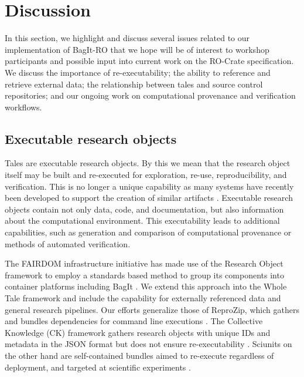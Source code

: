 \documentclass[conference]{IEEEtran}
\begin{document}
\section{Discussion} \label{discussion}

In this section, we highlight and discuss several issues related to our implementation of BagIt-RO that we hope will be of interest to workshop participants and possible input into current work on the RO-Crate specification. We discuss the importance of re-executability; the ability to reference and retrieve external data; the relationship between tales and source control repositories; and our ongoing work on computational provenance and verification workflows.

\subsection{Executable research objects}
Tales are executable research objects. By this we mean that the
research object itself may be built and re-executed for exploration,
re-use, reproducibility, and verification. This is no longer  a unique capability as many systems have recently been developed to support the creation of similar artifacts \cite{Chirigati2016, Binder2018, Yuan2018}. Executable research objects contain not only data, code, and documentation, but also information about the computational environment. This executability leads to additional capabilities, such as generation and comparison of computational provenance or methods of automated verification.

The FAIRDOM infrastructure initiative has made use of the Research
Object framework to employ a standards based method to group its
components into container platforms including BagIt
\cite{Stanford2016}. We extend this approach into the Whole Tale
framework and include the capability for externally referenced data
and general research pipelines. 
Our efforts generalize those of ReproZip, which gathers and bundles
dependencies for command line executions \cite{Chirigati2016}.
The Collective Knowledge (CK) framework gathers research objects with
unique IDs and metadata in the JSON format but does not ensure
re-executability \cite{fursin2018}. Sciunits on the other hand are
self-contained bundles aimed to re-execute regardless of  
deployment, and targeted at scientific experiments \cite{That2017,
  Yuan2018}.
\end{document}
